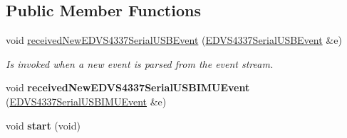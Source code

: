 \subsection*{Public Member Functions}
\begin{DoxyCompactItemize}
\item 
\hypertarget{class_dumb_e_d_v_s4337_listener_a2b41948d64b4d529e3a0e646e179e0e9}{}void \hyperlink{class_dumb_e_d_v_s4337_listener_a2b41948d64b4d529e3a0e646e179e0e9}{received\+New\+E\+D\+V\+S4337\+Serial\+U\+S\+B\+Event} (\hyperlink{struct_e_d_v_s4337_serial_u_s_b_event}{E\+D\+V\+S4337\+Serial\+U\+S\+B\+Event} \&e)\label{class_dumb_e_d_v_s4337_listener_a2b41948d64b4d529e3a0e646e179e0e9}

\begin{DoxyCompactList}\small\item\em Is invoked when a new event is parsed from the event stream. \end{DoxyCompactList}\item 
\hypertarget{class_dumb_e_d_v_s4337_listener_a6a04157d2fd293358261b9827842af38}{}void {\bfseries received\+New\+E\+D\+V\+S4337\+Serial\+U\+S\+B\+I\+M\+U\+Event} (\hyperlink{struct_e_d_v_s4337_serial_u_s_b_i_m_u_event}{E\+D\+V\+S4337\+Serial\+U\+S\+B\+I\+M\+U\+Event} \&e)\label{class_dumb_e_d_v_s4337_listener_a6a04157d2fd293358261b9827842af38}

\item 
\hypertarget{class_dumb_e_d_v_s4337_listener_a1c42cb95ff8b6588284aa52356e92954}{}void {\bfseries start} (void)\label{class_dumb_e_d_v_s4337_listener_a1c42cb95ff8b6588284aa52356e92954}

\end{DoxyCompactItemize}
